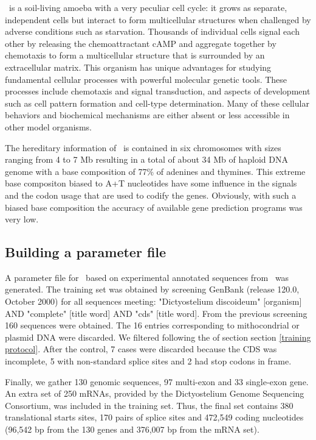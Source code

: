 \Dd\ is a soil-living amoeba with a very peculiar cell cycle: it 
grows as separate, independent cells but interact to form
multicellular structures when challenged by adverse conditions such as
starvation. Thousands of individual cells signal each other by
releasing the chemoattractant cAMP and aggregate together by
chemotaxis to form a multicellular structure that is surrounded by an
extracellular matrix. This organism has unique advantages for studying
fundamental cellular processes with powerful molecular genetic
tools. These processes include chemotaxis and signal transduction, and
aspects of development such as cell pattern formation and cell-type
determination. Many of these cellular behaviors and biochemical
mechanisms are either absent or less accessible in other model
organisms.

The hereditary information of \Dicty\ is contained in six chromosomes
with sizes ranging from 4 to 7 Mb resulting in a total of about 34 Mb
of haploid DNA genome with a base composition of 77\% of adenines and
thymines. This extreme base compositon biased to A+T nucleotides have
some influence in the signals and the codon usage that are used to
codify the genes. Obviously, with such a biased base composition the
accuracy of available gene prediction programs was very low.

\subsection*{Building a parameter file}

A parameter file for \geneid\ based on experimental annotated
sequences from \Dd\ was generated. The training set was obtained by
screening GenBank (release 120.0, October 2000) for all sequences
meeting: "Dictyostelium discoideum" [organism] AND "complete" [title
word] AND "cds" [title word]. From the previous screening 160
sequences were obtained. The 16 entries corresponding to mithocondrial
or plasmid DNA were discarded. We filtered following the of section
section \ref{training protocol}. After the control, 7 cases were
discarded because the CDS was incomplete, 5 with non-standard splice
sites and 2 had stop codons in frame.

Finally, we gather 130 genomic sequences, 97 multi-exon and 33
single-exon gene. An extra set of 250 mRNAs, provided by the
Dictyostelium Genome Sequencing Consortium, was included in the
training set. Thus, the final set contains 380 translational
starts sites, 170 pairs of splice sites and 472,549 coding nucleotides
(96,542 bp from the 130 genes and 376,007 bp from the mRNA set).



